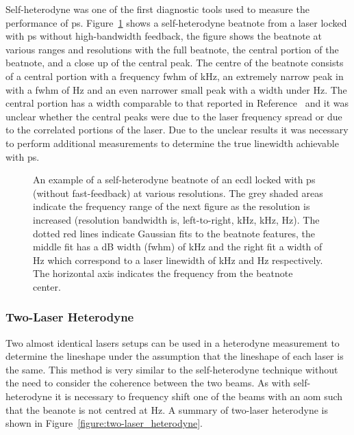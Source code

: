 Self-heterodyne was one of the first diagnostic tools used to measure the performance of \gls{ps}.
Figure~\ref{figure:self-heterodyne_example} shows a self-heterodyne beatnote from a laser locked with \gls{ps} without high-bandwidth feedback, the figure shows the beatnote at various ranges and resolutions with the full beatnote, the central portion of the beatnote, and a close up of the central peak.
The centre of the beatnote consists of a central portion with a frequency \gls{fwhm} of \unit[33]{kHz}, an extremely narrow peak in with a \gls{fwhm} of \unit[240]{Hz} and an even narrower small peak with a width under \unit[100]{Hz}.
The central portion has a width comparable to that reported in Reference~\cite{torii_laser-phase_2012} and it was unclear whether the central peaks were due to the laser frequency spread or due to the correlated portions of the laser.
Due to the unclear results it was necessary to perform additional measurements to determine the true linewidth achievable with \gls{ps}.

\begin{figure}
\center

\caption{An example of a self-heterodyne beatnote of an \gls{ecdl} locked with \gls{ps} (without fast-feedback) at various resolutions.
The grey shaded areas indicate the frequency range of the next figure as the resolution is increased (resolution bandwidth is, left-to-right, \unit[3]{kHz}, \unit[1]{kHz}, \unit[1]{Hz}).
The dotted red lines indicate Gaussian fits to the beatnote features, the middle fit has a \unit[-3]{dB} width (\gls{fwhm}) of \unit[77]{kHz} and the right fit a width of \unit[570]{Hz} which correspond to a laser linewidth of \unit[33]{kHz} and \unit[240]{Hz} respectively.
The horizontal axis indicates the frequency from the beatnote center.}
\label{figure:self-heterodyne_example}
\end{figure}

\subsubsection{Two-Laser Heterodyne}\label{section:two-laser_heterodyen}

Two almost identical lasers setups can be used in a heterodyne measurement to determine the lineshape under the assumption that the lineshape of each laser is the same.
This method is very similar to the self-heterodyne technique without the need to consider the coherence between the two beams.
As with self-heterodyne it is necessary to frequency shift one of the beams with an \gls{aom} such that the beanote is not centred at \unit[0]{Hz}.
A summary of two-laser heterodyne is shown in Figure~\ref{figure:two-laser_heterodyne}.

